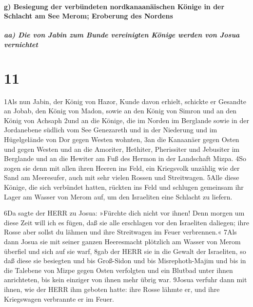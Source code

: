 \hypertarget{g-besiegung-der-verbuxfcndeten-nordkanaanuxe4ischen-kuxf6nige-in-der-schlacht-am-see-merom-eroberung-des-nordens}{%
\paragraph{g) Besiegung der verbündeten nordkanaanäischen Könige in der
Schlacht am See Merom; Eroberung des
Nordens}\label{g-besiegung-der-verbuxfcndeten-nordkanaanuxe4ischen-kuxf6nige-in-der-schlacht-am-see-merom-eroberung-des-nordens}}

\hypertarget{aa-die-von-jabin-zum-bunde-vereinigten-kuxf6nige-werden-von-josua-vernichtet}{%
\subparagraph{aa) Die von Jabin zum Bunde vereinigten Könige werden von
Josua
vernichtet}\label{aa-die-von-jabin-zum-bunde-vereinigten-kuxf6nige-werden-von-josua-vernichtet}}

\hypertarget{section-10}{%
\section{11}\label{section-10}}

1Als nun Jabin, der König von Hazor, Kunde davon erhielt, schickte er
Gesandte an Jobab, den König von Madon, sowie an den König von Simron
und an den König von Achsaph 2und an die Könige, die im Norden im
Berglande sowie in der Jordanebene südlich vom See Genezareth und in der
Niederung und im Hügelgelände von Dor gegen Westen wohnten, 3an die
Kanaanäer gegen Osten und gegen Westen und an die Amoriter, Hethiter,
Pherissiter und Jebusiter im Berglande und an die Hewiter am Fuß des
Hermon in der Landschaft Mizpa. 4So zogen sie denn mit allen ihren
Heeren ins Feld, ein Kriegsvolk unzählig wie der Sand am Meeresufer,
auch mit sehr vielen Rossen und Streitwagen. 5Alle diese Könige, die
sich verbündet hatten, rückten ins Feld und schlugen gemeinsam ihr Lager
am Wasser von Merom auf, um den Israeliten eine Schlacht zu liefern.

6Da sagte der HERR zu Josua: »Fürchte dich nicht vor ihnen! Denn morgen
um diese Zeit will ich es fügen, daß sie alle erschlagen vor den
Israeliten daliegen; ihre Rosse aber sollst du lähmen und ihre
Streitwagen im Feuer verbrennen.« 7Als dann Josua sie mit seiner ganzen
Heeresmacht plötzlich am Wasser von Merom überfiel und sich auf sie
warf, 8gab der HERR sie in die Gewalt der Israeliten, so daß diese sie
besiegten und bis Groß-Sidon und bis Misrephoth-Majim und bis in die
Talebene von Mizpe gegen Osten verfolgten und ein Blutbad unter ihnen
anrichteten, bis kein einziger von ihnen mehr übrig war. 9Josua verfuhr
dann mit ihnen, wie der HERR ihm geboten hatte: ihre Rosse lähmte er,
und ihre Kriegswagen verbrannte er im Feuer.


